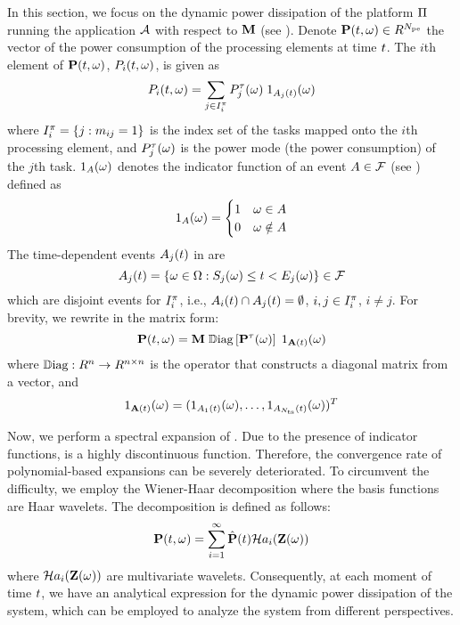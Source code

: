 In this section, we focus on the dynamic power dissipation of the platform $\Pi$ running the application $\mathcal{A}$ with respect to $\mathbf{M}$ (see ). Denote $\mathbf{P}(t, \omega) \in R^{N_\text{pe}}$ the vector of the power consumption of the processing elements at time $t$. The $i$th element of $\mathbf{P}(t, \omega)$, $P_i(t, \omega)$, is given as
\begin{equation} \elabel{processor-power}
  \PP_i(\t, \o) = \sum_{j \in \index^\pi_i} \PT_j(\o) \; \I_{\event_j(\t)}(\o)
\end{equation}
where $I^\pi_i = \{ j: m_{ij} = 1 \}$ is the index set of the tasks mapped onto the $i$th processing element, and $P^\tau_j(\omega)$ is the power mode (the power consumption) of the $j$th task. $1_A(\omega)$ denotes the indicator function of an event $A \in \mathcal{F}$ (see ) defined as
\[
  1_A(\omega) = \begin{cases}
      1 & \omega \in A \\
      0 & \omega \notin A
    \end{cases}
\]
The time-dependent events $A_j(t)$ in  are
\[
  A_j(t) = \{ \omega \in \Omega: S_j(\omega) \leq t < E_j(\omega) \} \in \mathcal{F}
\]
which are disjoint events for $I^\pi_i$, i.e., $A_i(t) \cap A_j(t) = \emptyset$, $i, j \in I^\pi_i$, $i \neq j$. For brevity, we rewrite  in the matrix form:
\begin{equation} \elabel{platform-power}
  \vPP(\t, \o) = \mM \; \oDiag{\vPT(\o)} \; \I_{\m{\event}(\t)}(\o)
\end{equation}
where $\oDiag: \real^n \to \real^{n \times n}$ is the operator that constructs a diagonal matrix from a vector, and
\[
  1_{\mathbf{A}(t)}(\omega) = (1_{A_1(t)}(\omega), \dots, 1_{A_{N_\text{ts}}(t)}(\omega))^T
\]

Now, we perform a spectral expansion of . Due to the presence of indicator functions,  is a highly discontinuous function. Therefore, the convergence rate of polynomial-based expansions can be severely deteriorated. To circumvent the difficulty, we employ the Wiener-Haar decomposition \cite{maitre2004} where the basis functions are Haar wavelets. The decomposition is defined as follows:
\[
  \mathbf{P}(t, \omega) = \sum_{i = 1}^\infty \hat{\mathbf{P}}(t) \mathcal{H}a_i(\mathbf{Z}(\omega))
\]
where $\mathcal{H}a_i(\mathbf{Z}(\omega))$ are multivariate wavelets. Consequently, at each moment of time $t$, we have an analytical expression for the dynamic power dissipation of the system, which can be employed to analyze the system from different perspectives.
